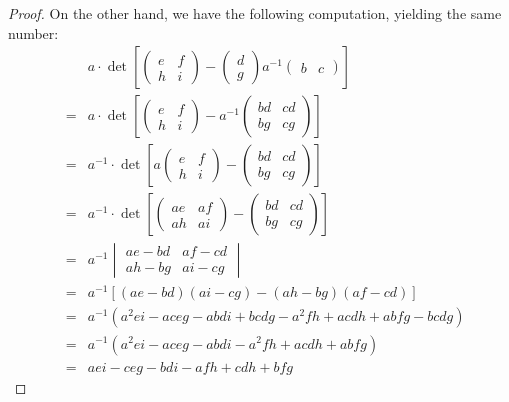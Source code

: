 \documentclass[12pt]{amsbook}
\begin{document}
\begin{proof}
On the other hand, we have the following computation, yielding the same number:
\begin{eqnarray*}
&&a\cdot\det\left[\begin{pmatrix}e&f\\h&i\end{pmatrix}
-\begin{pmatrix}d\\ g\end{pmatrix}a^{-1}
\begin{pmatrix}b&c\end{pmatrix}\right]\\
&=&a\cdot\det\left[\begin{pmatrix}e&f\\h&i\end{pmatrix}
-a^{-1}\begin{pmatrix}bd&cd\\
bg&cg\end{pmatrix}\right]\\
&=&a^{-1}\cdot\det\left[a\begin{pmatrix}e&f\\h&i\end{pmatrix}
-\begin{pmatrix}bd&cd\\
bg&cg\end{pmatrix}\right]\\
&=&a^{-1}\cdot\det\left[\begin{pmatrix}ae&af\\ah&ai\end{pmatrix}
-\begin{pmatrix}bd&cd\\
bg&cg\end{pmatrix}\right]\\
&=&a^{-1}\begin{vmatrix}ae-bd&af-cd\\ ah-bg&ai-cg\end{vmatrix}\\
&=&a^{-1}[(ae-bd)(ai-cg)-(ah-bg)(af-cd)]\\
&=&a^{-1}(a^2ei-aceg-abdi+bcdg-a^2fh+acdh+abfg-bcdg)\\
&=&a^{-1}(a^2ei-aceg-abdi-a^2fh+acdh+abfg)\\
&=&aei-ceg-bdi-afh+cdh+bfg
\end{eqnarray*}


\end{proof}
\end{document}
